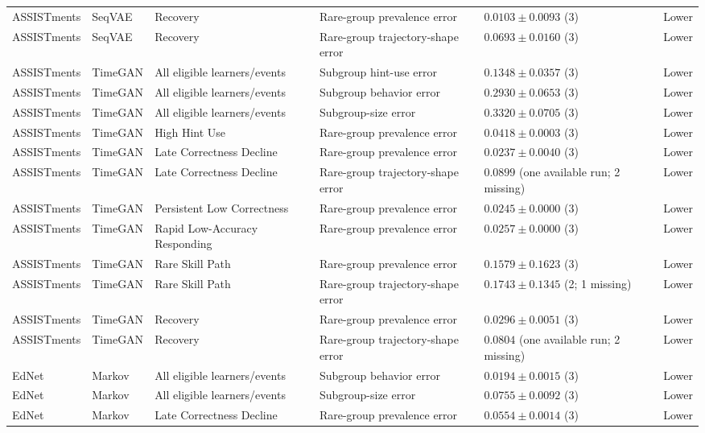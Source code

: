 \begin{longtable}{@{}p{2.25cm}p{2.05cm}p{4.7cm}p{5.0cm}p{2.6cm}p{1.25cm}@{}}
ASSISTments & SeqVAE & Recovery & Rare-group prevalence error & $0.0103 \mathbin{\pm} 0.0093$ (3) & Lower \\
ASSISTments & SeqVAE & Recovery & Rare-group trajectory-shape error & $0.0693 \mathbin{\pm} 0.0160$ (3) & Lower \\
ASSISTments & TimeGAN & All eligible learners/events & Subgroup hint-use error & $0.1348 \mathbin{\pm} 0.0357$ (3) & Lower \\
ASSISTments & TimeGAN & All eligible learners/events & Subgroup behavior error & $0.2930 \mathbin{\pm} 0.0653$ (3) & Lower \\
ASSISTments & TimeGAN & All eligible learners/events & Subgroup-size error & $0.3320 \mathbin{\pm} 0.0705$ (3) & Lower \\
ASSISTments & TimeGAN & High Hint Use & Rare-group prevalence error & $0.0418 \mathbin{\pm} 0.0003$ (3) & Lower \\
ASSISTments & TimeGAN & Late Correctness Decline & Rare-group prevalence error & $0.0237 \mathbin{\pm} 0.0040$ (3) & Lower \\
ASSISTments & TimeGAN & Late Correctness Decline & Rare-group trajectory-shape error & $0.0899$ (one available run; 2 missing) & Lower \\
ASSISTments & TimeGAN & Persistent Low Correctness & Rare-group prevalence error & $0.0245 \mathbin{\pm} 0.0000$ (3) & Lower \\
ASSISTments & TimeGAN & Rapid Low-Accuracy Responding & Rare-group prevalence error & $0.0257 \mathbin{\pm} 0.0000$ (3) & Lower \\
ASSISTments & TimeGAN & Rare Skill Path & Rare-group prevalence error & $0.1579 \mathbin{\pm} 0.1623$ (3) & Lower \\
ASSISTments & TimeGAN & Rare Skill Path & Rare-group trajectory-shape error & $0.1743 \mathbin{\pm} 0.1345$ (2; 1 missing) & Lower \\
ASSISTments & TimeGAN & Recovery & Rare-group prevalence error & $0.0296 \mathbin{\pm} 0.0051$ (3) & Lower \\
ASSISTments & TimeGAN & Recovery & Rare-group trajectory-shape error & $0.0804$ (one available run; 2 missing) & Lower \\
EdNet & Markov & All eligible learners/events & Subgroup behavior error & $0.0194 \mathbin{\pm} 0.0015$ (3) & Lower \\
EdNet & Markov & All eligible learners/events & Subgroup-size error & $0.0755 \mathbin{\pm} 0.0092$ (3) & Lower \\
EdNet & Markov & Late Correctness Decline & Rare-group prevalence error & $0.0554 \mathbin{\pm} 0.0014$ (3) & Lower \\

\end{longtable}
